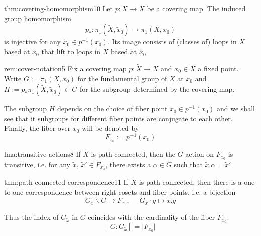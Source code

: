 \documentclass[landscape, 8pt]{extarticle}
\begin{document}
\begin{multicols*}{3}
\begin{thm}{thm:covering-homomorphism}{10}
	Let $p : \tilde{X} \to X$ be a covering map. The induced group homomorphism
	\[p_{\ast} : \pi_{1}(\tilde{X}, \tilde{x}_{0}) \to \pi_{1}(X, x_{0})\]
	is injective for any $\tilde{x}_{0}\in p^{-1}(x_{0})$. Its image consists of (classes of) loops in $X$ based at $x_{0}$ that lift to loops in $\tilde{X}$ based at $\tilde{x}_{0}$
\end{thm}

\vspace{-7pt}
\begin{rem}{rem:cover-notation}{5}
	\vspace{-2pt}
	Fix a covering map $p : \tilde{X} \to X$ and $x_{0}\in X$ a fixed point. Write $G := \pi_{1}(X, x_{0})$ for the fundamental group of $X$ at $x_{0}$ and $H := p_{\ast} \pi_{1}(\tilde{X}, \tilde{x}_{0}) \subset G$ for the subgroup determined by the covering map.

	The subgroup $H$ depends on the choice of fiber point $\tilde{x}_{0}\in p^{-1}(x_{0})$ and we shall see that it subgroups for different fiber points are conjugate to each other. Finally, the fiber over $x_{0}$ will be denoted by
	\[F_{x_{0}} := p^{-1}(x_{0})\]
\end{rem}


\vspace{-7pt}
\begin{lma}{lma:transitive-actions}{8}
	\vspace{-2pt}
	If $\tilde{X}$ is path-connected, then the $G$-action on $F_{x_{0}}$ is transitive, i.e. for any $\tilde{x},\, \tilde{x}'\in F_{x_{0}}$, there exists a $\alpha\in G$ such that $\tilde{x}.\alpha = \tilde{x}'$.
\end{lma}


\vspace{-7pt}
\begin{thm}{thm:path-connected-correspondence}{11}
	\vspace{-2pt}
	If $\tilde{X}$ is path-connected, then there is a one-to-one correspondence between right cosets and fiber points, i.e. a bijection
	\[G_{\tilde{x}} \backslash G \to F_{x_{0}},\;\quad G_{\tilde{x}} \cdot g \mapsto \tilde{x}.g\]
	\par\vspace{-5pt}
	\tcbline
	Thus the index of $G_{\tilde{x}}$ in $G$ coincides with the cardinality of the fiber $F_{x_{0}}$:
	\vspace{-6pt}
	\setcounter{equation}{19}
	\begin{equation}\label{eq:path-connected-correspondence}
		[G : G_{\tilde{x}}] = \lvert F_{x_{0}} \rvert
	\end{equation}


\end{thm}
\end{multicols*}
\end{document}
